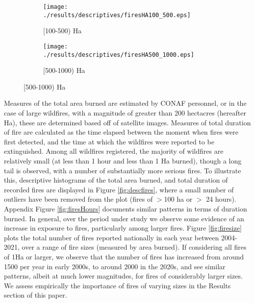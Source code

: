 \documentclass[11pt]{article}
\begin{document}
\begin{spacing}{1.5}
\begin{figure}[htpb!]
    \begin{subfigure}{0.49\textwidth}
          \texttt{[image: ./results/descriptives/firesHA100\_500.eps]}
         \caption{[100-500) Ha}
    \end{subfigure}
    \begin{subfigure}{0.49\textwidth}
          \texttt{[image: ./results/descriptives/firesHA500\_1000.eps]}
         \caption{[500-1000) Ha}
    \end{subfigure}
\end{figure}

Measures of the total area burned are estimated by CONAF personnel, or in the case of large wildfires, with a magnitude of greater than 200 hectacres (hereafter Ha), these are determined based off of satellite images. Measures of total duration of fire are calculated as the time elapsed between the moment when fires were first detected, and the time at which the wildfires were reported to be extinguished.  Among all wildfires registered, the majority of wildfires are relatively small (at less than 1 hour and less than 1 Ha burned), though a long tail is observed, with a number of substantially more serious fires.  To illustrate this, descriptive histograms of the total area burned, and total duration of recorded fires are displayed in Figure \ref{fig:descfires}, where a small number of outliers have been removed from the plot (fires of $>$100 ha or $>$ 24 hours).  Appendix Figure \ref{fig:firesHours} documents similar patterns in terms of duration burned.  
In general, over the period under study we observe some evidence of an increase in exposure to fires, particularly among larger fires.  Figure \ref{fig:firesize} plots the total number of fires reported nationally in each year between 2004-2021, over a range of fire sizes (measured by area burned).  If considering all fires of 1Ha or larger, we observe that the number of fires has increased from around 1500 per year in early 2000s, to around 2000 in the 2020s, and see similar patterns, albeit at much lower magnitudes, for fires of considerably larger sizes.  We assess empirically the importance of fires of varying sizes in the Results section of this paper.



\end{spacing}
\end{document}
